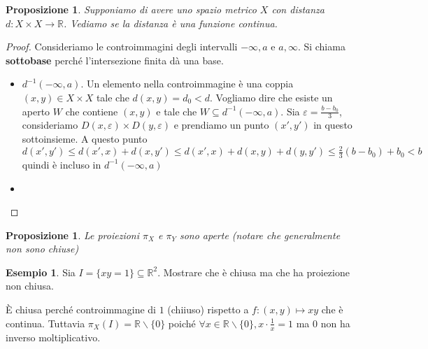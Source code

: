 \documentclass{article}
\newcounter{theo}[section]\setcounter{theo}{0}
\newcounter{excounter}[section]\setcounter{excounter}{0}
\theoremstyle{plain}
\newtheorem{proposition}[theo]{Proposizione}
\theoremstyle{definition}
\newtheorem{example}[excounter]{Esempio}
\theoremstyle{remark}
\begin{document}
\begin{proposition}
    Supponiamo di avere uno spazio metrico \(X\) con distanza \(d: X\times X \to
    \mathbb{R}\). Vediamo se la distanza è una funzione continua.
\end{proposition}
\begin{proof}
    Consideriamo le controimmagini degli intervalli \(-\infty, a\) e \(a,
    \infty\). Si chiama \textbf{sottobase} perché l'intersezione finita dà una
    base.
\begin{itemize}[label = --]
    \item \(d^{-1}(-\infty, a)\). Un elemento nella controimmagine è una coppia
        \((x, y) \in X\times X\)  tale che \(d(x,y) = d_{0} < d\). Vogliamo dire
        che esiste un aperto \(W\) che contiene \((x,y)\) e tale che \(W
        \subseteq d^{-1}(-\infty,a) \). Sia \(\varepsilon = \frac{b-b_{0}}{3}\),
        consideriamo \(D(x, \varepsilon) \times D(y, \varepsilon)\) e prendiamo
        un punto \((x', y')\) in questo sottoinsieme. A questo punto \(d(x',
        y')\le d(x', x) + d(x, y') \le d(x',x) + d(x,y)+d(y,y') \le
        \frac{2}{3}(b-b_{0}) + b_{0} < b\) quindi è incluso in
        \(d^{-1}(-\infty,a)\) 
    \item %
\end{itemize}
\end{proof}

\begin{proposition}
    Le proiezioni \(\pi_X\) e \(\pi_Y\) sono aperte (notare che generalmente non
    sono chiuse) 
\end{proposition}
\begin{example}
    Sia \(I = \{xy=1\} \subseteq \mathbb{R}^2\). Mostrare che è chiusa ma che ha
    proiezione non chiusa.

    È chiusa perché controimmagine di \(1\) (chiiuso) rispetto a \(f: (x, y) \mapsto xy\)
    che è continua. Tuttavia \(\pi_X(I) = \mathbb{R} \smallsetminus \{0\} \)
    poiché \(\forall x \in \mathbb{R} \smallsetminus \{0\}, x \cdot \frac{1}{x}
    = 1\) ma 0 non ha inverso moltiplicativo.
\end{example}
\end{document}
